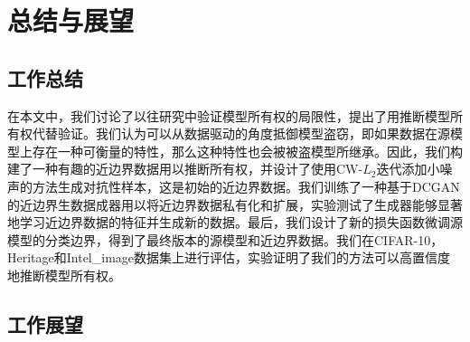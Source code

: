 \chapter{总结与展望}\label{6}


\section{工作总结}

在本文中，我们讨论了以往研究中验证模型所有权的局限性，提出了用推断模型所有权代替验证。我们认为可以从数据驱动的角度抵御模型盗窃，即如果数据在源模型上存在一种可衡量的特性，那么这种特性也会被被盗模型所继承。因此，我们构建了一种有趣的近边界数据用以推断所有权，并设计了使用CW-$L_2$迭代添加小噪声的方法生成对抗性样本，这是初始的近边界数据。我们训练了一种基于DCGAN的近边界生数据成器用以将近边界数据私有化和扩展，实验测试了生成器能够显著地学习近边界数据的特征并生成新的数据。最后，我们设计了新的损失函数微调源模型的分类边界，得到了最终版本的源模型和近边界数据。我们在CIFAR-10，Heritage和Intel\_image数据集上进行评估，实验证明了我们的方法可以高置信度地推断模型所有权。

\section{工作展望}
